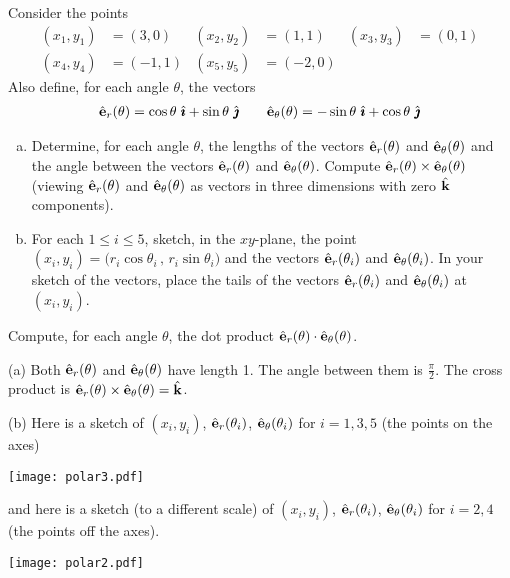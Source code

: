 \begin{question}\label{prb polar vectors}
Consider the points
\begin{align*}
(x_1,y_1) &= (3,0) &
(x_2,y_2) &= (1,1)  &
(x_3,y_3) &= (0,1) \\
(x_4,y_4) &= (-1,1) &
(x_5,y_5) &= (-2,0)
\end{align*}
Also define, for each angle $\theta$, the vectors
\begin{align*}
\hat{\mathbf{e}}_r(\theta)=\cos\theta\ \hat{\pmb{\imath}} + \sin\theta\ \hat{\pmb{\jmath}}\qquad
\hat{\mathbf{e}}_\theta(\theta) = -\sin\theta\ \hat{\pmb{\imath}} + \cos\theta\ \hat{\pmb{\jmath}}
\end{align*}
\begin{enumerate}[(a)]
\item
Determine, for each angle $\theta$, the lengths of the vectors
$\hat{\mathbf{e}}_r(\theta)$ and $\hat{\mathbf{e}}_\theta(\theta)$ and the angle between 
the vectors $\hat{\mathbf{e}}_r(\theta)$ and $\hat{\mathbf{e}}_\theta(\theta)$. Compute
$\hat{\mathbf{e}}_r(\theta)\times\hat{\mathbf{e}}_\theta(\theta)$ (viewing $\hat{\mathbf{e}}_r(\theta)$ and $\hat{\mathbf{e}}_\theta(\theta)$ as vectors in three dimensions with zero $\hat{\mathbf{k}}$ 
components).
\item
For each $1\le i\le 5$, sketch, in the $xy$-plane, the point 
$(x_i,y_i)= \big(r_i\cos\theta_i\,,\,r_i\sin\theta_i\big)$
and the vectors $\hat{\mathbf{e}}_r(\theta_i)$ and $\hat{\mathbf{e}}_\theta(\theta_i)$. In your
sketch of the vectors, place the tails of the vectors 
$\hat{\mathbf{e}}_r(\theta_i)$ and $\hat{\mathbf{e}}_\theta(\theta_i)$ at $(x_i,y_i)$.
\end{enumerate}
\end{question}

\begin{hint} 
Compute, for each angle $\theta$, the dot product $\hat{\mathbf{e}}_r(\theta)\cdot\hat{\mathbf{e}}_\theta(\theta)$.
\end{hint}

\begin{answer} 
(a) Both $\hat{\mathbf{e}}_r(\theta)$ and $\hat{\mathbf{e}}_\theta(\theta)$ have length 1.
The angle between them is $\frac{\pi}{2}$. The cross product is
$\hat{\mathbf{e}}_r(\theta) \times \hat{\mathbf{e}}_\theta(\theta)=\hat{\mathbf{k}}$.

(b)
Here is a sketch of $(x_i,y_i)$, $\hat{\mathbf{e}}_r(\theta_i)$,
$\hat{\mathbf{e}}_\theta(\theta_i)$ for $i =1,3,5$ (the points on the axes)
\begin{center}
  \texttt{[image: polar3.pdf]}
\end{center}
and here is a sketch (to a different scale) of $(x_i,y_i)$, $\hat{\mathbf{e}}_r(\theta_i)$,
$\hat{\mathbf{e}}_\theta(\theta_i)$ for $i =2,4$ (the points off the axes).
\begin{center}       
  \texttt{[image: polar2.pdf]}
\end{center}
\end{answer}


